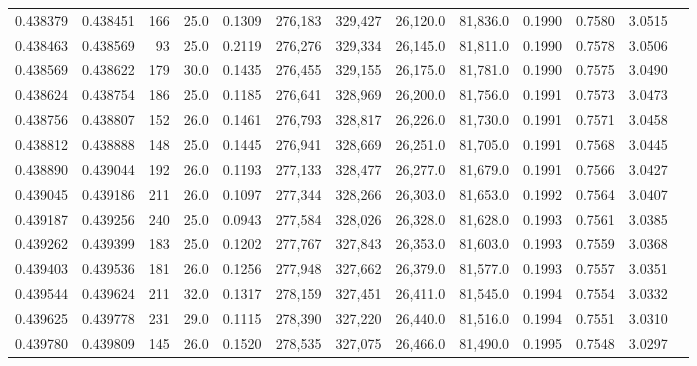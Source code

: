 \begin{tabular}{rrrrrrrrrrrrr}
0.438379 & 0.438451 &   166 & 25.0 &                                     0.1309 & 276,183 & 329,427 &  26,120.0 &  81,836.0 & 0.1990 & 0.7580 & 3.0515 \\
0.438463 & 0.438569 &    93 & 25.0 &                                     0.2119 & 276,276 & 329,334 &  26,145.0 &  81,811.0 & 0.1990 & 0.7578 & 3.0506 \\
0.438569 & 0.438622 &   179 & 30.0 &                                     0.1435 & 276,455 & 329,155 &  26,175.0 &  81,781.0 & 0.1990 & 0.7575 & 3.0490 \\
0.438624 & 0.438754 &   186 & 25.0 &                                     0.1185 & 276,641 & 328,969 &  26,200.0 &  81,756.0 & 0.1991 & 0.7573 & 3.0473 \\
0.438756 & 0.438807 &   152 & 26.0 &                                     0.1461 & 276,793 & 328,817 &  26,226.0 &  81,730.0 & 0.1991 & 0.7571 & 3.0458 \\
0.438812 & 0.438888 &   148 & 25.0 &                                     0.1445 & 276,941 & 328,669 &  26,251.0 &  81,705.0 & 0.1991 & 0.7568 & 3.0445 \\
0.438890 & 0.439044 &   192 & 26.0 &                                     0.1193 & 277,133 & 328,477 &  26,277.0 &  81,679.0 & 0.1991 & 0.7566 & 3.0427 \\
0.439045 & 0.439186 &   211 & 26.0 &                                     0.1097 & 277,344 & 328,266 &  26,303.0 &  81,653.0 & 0.1992 & 0.7564 & 3.0407 \\
0.439187 & 0.439256 &   240 & 25.0 &                                     0.0943 & 277,584 & 328,026 &  26,328.0 &  81,628.0 & 0.1993 & 0.7561 & 3.0385 \\
0.439262 & 0.439399 &   183 & 25.0 &                                     0.1202 & 277,767 & 327,843 &  26,353.0 &  81,603.0 & 0.1993 & 0.7559 & 3.0368 \\
0.439403 & 0.439536 &   181 & 26.0 &                                     0.1256 & 277,948 & 327,662 &  26,379.0 &  81,577.0 & 0.1993 & 0.7557 & 3.0351 \\
0.439544 & 0.439624 &   211 & 32.0 &                                     0.1317 & 278,159 & 327,451 &  26,411.0 &  81,545.0 & 0.1994 & 0.7554 & 3.0332 \\
0.439625 & 0.439778 &   231 & 29.0 &                                     0.1115 & 278,390 & 327,220 &  26,440.0 &  81,516.0 & 0.1994 & 0.7551 & 3.0310 \\
0.439780 & 0.439809 &   145 & 26.0 &                                     0.1520 & 278,535 & 327,075 &  26,466.0 &  81,490.0 & 0.1995 & 0.7548 & 3.0297 \\

\end{tabular}
